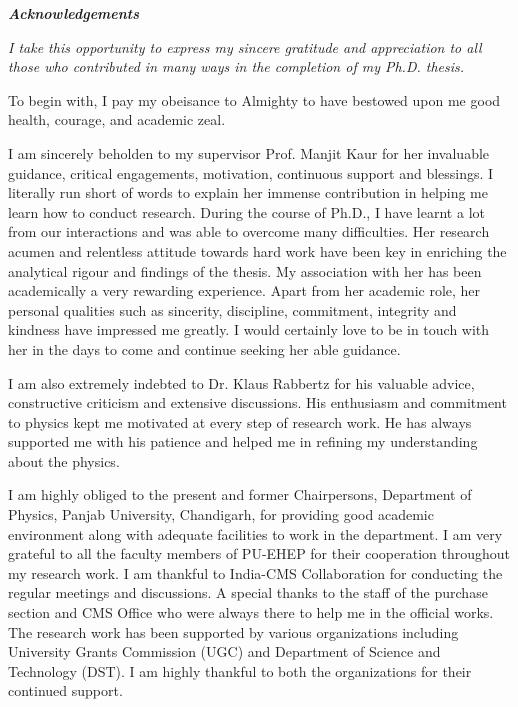 \begin{center}
{\LARGE \bf{\em Acknowledgements}}
\end{center}
\vspace*{0.5cm}
{ \em
I take this opportunity to express my sincere gratitude and appreciation to all those who contributed in many ways in the completion of my Ph.D. thesis. 

To begin with, I pay my obeisance to Almighty to have bestowed upon me good health, courage, and academic zeal.

I am sincerely beholden to my supervisor Prof. Manjit Kaur for her invaluable guidance, critical engagements, motivation, continuous support and blessings. I literally run short of words to explain her immense contribution in helping me learn how to conduct research. During the course of Ph.D., I have learnt a lot from our interactions and was able to overcome many difficulties. Her research acumen and relentless attitude towards hard work have been key in enriching the analytical rigour and findings of the thesis. My association with her has been academically a very rewarding experience. Apart from her academic role, her personal qualities such as sincerity, discipline, commitment, integrity and kindness have impressed me greatly. I would certainly love to be in touch with her in the days to come and continue seeking her able guidance.

I am also extremely indebted to Dr. Klaus Rabbertz for his valuable advice, constructive criticism and extensive discussions. His enthusiasm and commitment to physics kept me motivated at every step of research work. He has always supported me with his patience and helped me in refining my understanding about the physics. 

I am highly obliged to the present and former Chairpersons, Department of Physics, Panjab University, Chandigarh, for providing good academic environment along with adequate facilities to work in the department. I am very grateful to all the faculty members of PU-EHEP for their cooperation throughout my research work. I am thankful to India-CMS Collaboration for conducting the regular meetings and discussions. A special thanks to the staff of the purchase section and CMS Office who were always there to help me in the official works. The research work has been supported by various organizations including University Grants Commission (UGC) and Department of Science and Technology (DST). I am highly thankful to both the organizations for their continued support. 

}
